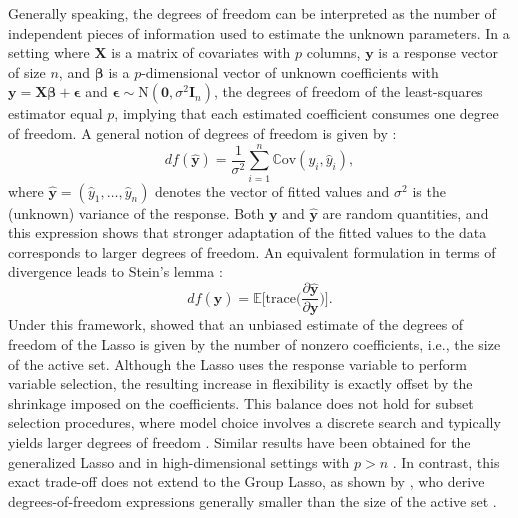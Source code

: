 \documentclass[a4paper, 12pt]{article}
\def\bbeta{\boldsymbol{\beta}}
\def\bepsilon{\boldsymbol{\epsilon}}
\def\by{\boldsymbol{y}}
\def\bI{\mathbf{I}}
\def\bX{\mathbf{X}}
\def\by{\mathbf{y}}
\begin{document}
%
Generally speaking, the degrees of freedom can be interpreted as the number of independent pieces of information used to estimate the unknown parameters. 
In a setting where $\bX$ is a matrix of covariates with $p$ columns, $\by$ is a response vector of size $n$, and $\bbeta$ is a $p$-dimensional vector of unknown coefficients with $\by = \bX \bbeta + \bepsilon$ and $\bepsilon \sim \text{N}(\boldsymbol{0}, \sigma^2 \bI_n)$, the degrees of freedom of the least-squares estimator equal $p$, implying that each estimated coefficient consumes one degree of freedom. A general notion of degrees of freedom is given by \cite{efron_dof}:
\begin{equation}
\label{eq:df_general_expression}
df(\widehat{\by}) = \frac{1}{\sigma^2}\sum_{i=1}^n \mathbb{C}\text{ov}(y_i, \widehat{y}_i),
\end{equation}
where $\widehat{\by} = (\widehat{y}_1, \ldots, \widehat{y}_n)$ denotes the vector of fitted values and $\sigma^2$ is the (unknown) variance of the response. Both $\by$ and $\widehat{\by}$ are random quantities, and this expression shows that stronger adaptation of the fitted values to the data corresponds to larger degrees of freedom. An equivalent formulation in terms of divergence leads to Stein’s lemma \citep{stein1981sure}:
\begin{equation}
\label{eq:df_stein}
df(\widehat{\by}) = \mathbb{E}\bigg[\text{trace} \bigg(\frac{\partial \widehat{\by}}{\partial \by}\bigg)\bigg].
\end{equation}
%
Under this framework, \cite{zou2007} showed that an unbiased estimate of the degrees of freedom of the Lasso is given by the number of nonzero coefficients, i.e., the size of the active set. Although the Lasso uses the response variable to perform variable selection, the resulting increase in flexibility is exactly offset by the shrinkage imposed on the coefficients. This balance does not hold for subset selection procedures, where model choice involves a discrete search and typically yields larger degrees of freedom \citep[see][]{tibshirani2015ss}. Similar results have been obtained for the generalized Lasso \citep{tibshirani_taylor_2011, Chen_etal.2020jasa} and in high-dimensional settings with $p>n$ \citep{dossal2013dof_lasso_general, tibshirani_taylor.2012}. In contrast, this exact trade-off does not extend to the Group Lasso, as shown by \cite{vaiter_etal.2017}, who derive degrees-of-freedom expressions generally smaller than the size of the active set \citep[see also][]{vaiter2012dof_grouplasso}.\par
\end{document}
